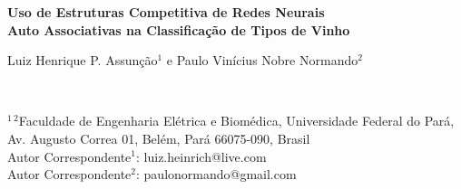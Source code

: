 



\begin{center}


\vspace*{2 cm}

\textsf{\bfseries 
\huge Uso de Estruturas Competitiva de Redes Neurais \\[3 mm]
Auto Associativas na Classificação
de Tipos de Vinho}



\vspace*{1.5 cm}

	\begin{large}
Luiz Henrique P. Assunção$^{1}$ e
Paulo Vinícius Nobre Normando$^{2}$
	\end{large} \\[1.7 mm]



	\begin{small}
$^{1\ 2}$Faculdade de Engenharia Elétrica e Biomédica, Universidade Federal do Pará, \\[1 mm]
Av. Augusto Correa 01, Belém, Pará 66075-090, Brasil \\[7 mm]



Autor Correspondente$^{1}$: luiz.heinrich@live.com	\\[1 mm]
Autor Correspondente$^{2}$: paulonormando@gmail.com

	\end{small}

\end{center}
 


